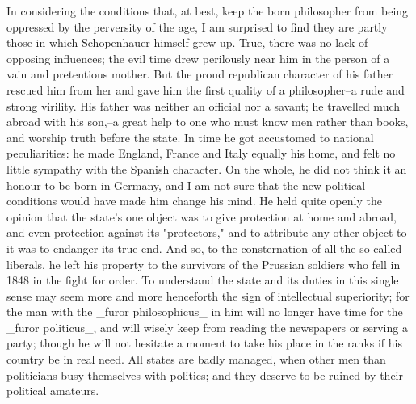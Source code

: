 In considering the conditions that, at best, keep the born
philosopher from being oppressed by the perversity of the age, I am
surprised to find they are partly those in which Schopenhauer himself
grew up. True, there was no lack of opposing influences; the evil
time drew perilously near him in the person of a vain and pretentious
mother. But the proud republican character of his father rescued him
from her and gave him the first quality of a philosopher--a rude and
strong virility. His father was neither an official nor a savant; he
travelled much abroad with his son,--a great help to one who must
know men rather than books, and worship truth before the state. In
time he got accustomed to national peculiarities: he made England,
France and Italy equally his home, and felt no little sympathy with
the Spanish character. On the whole, he did not think it an honour to
be born in Germany, and I am not sure that the new political
conditions would have made him change his mind. He held quite openly
the opinion that the state's one object was to give protection at
home and abroad, and even protection against its "protectors," and to
attribute any other object to it was to endanger its true end. And
so, to the consternation of all the so-called liberals, he left his
property to the survivors of the Prussian soldiers who fell in 1848
in the fight for order. To understand the state and its duties in
this single sense may seem more and more henceforth the sign of
intellectual superiority; for the man with the _furor philosophicus_
in him will no longer have time for the _furor politicus_, and will
wisely keep from reading the newspapers or serving a party; though he
will not hesitate a moment to take his place in the ranks if his
country be in real need. All states are badly managed, when other men
than politicians busy themselves with politics; and they deserve to
be ruined by their political amateurs.

